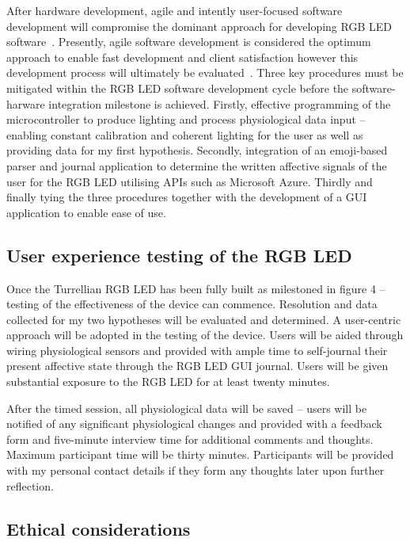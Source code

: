 \documentclass{sigchi}
\begin{document}
After hardware development, agile and intently user-focused software development will compromise the dominant approach for developing RGB LED software~\cite{abrahamsson2017agile, cockburn2006agile}. Presently, agile software development is considered the optimum approach to enable fast development and client satisfaction however this development process will ultimately be evaluated~\cite{abrahamsson2017agile}. Three key procedures must be mitigated within the RGB LED software development cycle before the software-harware integration milestone is achieved. Firstly, effective programming of the microcontroller to produce lighting and process physiological data input – enabling constant calibration and coherent lighting for the user as well as providing data for my first hypothesis. Secondly, integration of an emoji-based parser and journal application to determine the written affective signals of the user for the RGB LED utilising APIs such as Microsoft Azure. Thirdly and finally tying the three procedures together with the development of a GUI application to enable ease of use. 

\subsection{User experience testing of the RGB LED}

Once the Turrellian RGB LED has been fully built as milestoned in figure 4 – testing of the effectiveness of the device can commence. Resolution and data collected for my two hypotheses will be evaluated and determined. A user-centric approach will be adopted in the testing of the device. Users will be aided through wiring physiological sensors and provided with ample time to self-journal their present affective state through the RGB LED GUI journal. Users will be given substantial exposure to the RGB LED for at least twenty minutes.

After the timed session, all physiological data will be saved – users will be notified of any significant physiological changes and provided with a feedback form and five-minute interview time for additional comments and thoughts. Maximum participant time will be thirty minutes. Participants will be provided with my personal contact details if they form any thoughts later upon further reflection.

\subsection{Ethical considerations}
\end{document}
